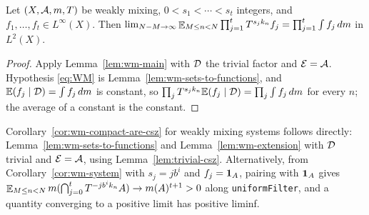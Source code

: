 \begin{corollary}
  \label{cor:wm-system}
  \leanok
  Let $(X,\mathcal{A},m,T)$ be weakly mixing, $0 < s_1 < \cdots < s_t$ integers, and
  $f_1,\dots,f_t \in L^{\infty}(X)$.  Then
  $\lim_{N-M \to \infty} \mathop{\mathbb{E}}_{M \leq n < N} \prod_{j=1}^{t} T^{s_j k_n} f_j = \prod_{j=1}^{t} \int f_j \, dm$ in $L^2(X)$.
\end{corollary}

\begin{proof}
  Apply Lemma~\ref{lem:wm-main} with $\mathcal{D}$ the trivial factor and $\mathcal{E} = \mathcal{A}$.  Hypothesis
  \eqref{eq:WM} is Lemma~\ref{lem:wm-sets-to-functions}, and
  $\mathbb{E}(f_j\mid\mathcal{D}) = \int f_j\,dm$ is constant, so
  $\prod_j T^{s_jk_n}\mathbb{E}(f_j\mid\mathcal{D}) = \prod_j \int f_j\,dm$ for every $n$; the average of a
  constant is the constant.
\end{proof}

\begin{remark}
  Corollary~\ref{cor:wm-compact-are-csz} for weakly mixing systems follows directly:
  Lemma~\ref{lem:wm-sets-to-functions} and Lemma~\ref{lem:wm-extension} with
  $\mathcal{D}$ trivial and $\mathcal{E} = \mathcal{A}$, using Lemma~\ref{lem:trivial-csz}.  Alternatively, from
  Corollary~\ref{cor:wm-system} with $s_j = jb^i$ and $f_j = \mathbf{1}_A$, pairing with $\mathbf{1}_A$
  gives $\mathop{\mathbb{E}}_{M \leq n < N} m(\bigcap_{j=0}^{t} T^{-jb^ik_n}A) \to m(A)^{t+1} > 0$ along
  \texttt{uniformFilter}, and a quantity converging to a positive limit has positive liminf.
\end{remark}
